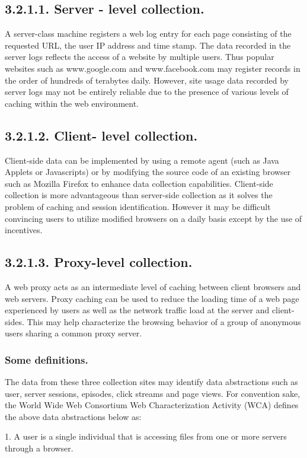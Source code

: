 \documentclass{article}
\begin{document}
\subsection*{\small{3.2.1.1. Server - level collection.}}
 A server-class machine registers a web log entry for each page consisting of the requested URL, the user IP address and time stamp. The data recorded in the server logs reflects the access of a website by multiple users. Thus popular websites such as www.google.com and www.facebook.com  may register records in the order of hundreds of terabytes daily. However, site usage data recorded by server logs may not be entirely reliable due to the presence of various levels of caching within the web environment.
\subsection*{\small{3.2.1.2. Client- level collection}.}
Client-side data can be implemented by using a remote agent (such as Java Applets or Javascripts) or by modifying the source code of an existing browser such as Mozilla Firefox to enhance data collection capabilities. Client-side collection is more advantageous than server-side collection as it solves the problem of caching and session identification. However it may be difficult convincing users to utilize modified browsers on a daily basis except by the use of incentives.
\subsection*{\small{3.2.1.3. Proxy-level collection}.}
A web proxy acts as an intermediate level of caching between client browsers and web servers. Proxy caching can be used to reduce the loading time of a web page experienced by users as well as the network traffic load at the server and client-sides. This may help characterize the browsing behavior of a group of anonymous users sharing a common proxy server.

\subsubsection{ Some definitions.}
The data from these three collection sites may identify data abstractions such as user, server sessions, episodes, click streams and page views. For convention sake, the World Wide Web Consortium Web Characterization Activity (WCA) defines the above data abstractions below as: 

1.	A user is a single individual that is accessing files from one or more servers through a browser.
\end{document}
